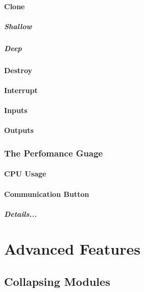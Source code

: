 \subsubsection{Clone}
\paragraph{Shallow}
\paragraph{Deep}
\subsubsection{Destroy}
\subsubsection{Interrupt}
\subsubsection{Inputs}
\subsubsection{Outputs}

\subsection{The Perfomance Guage}
\subsubsection{CPU Usage}
\subsubsection{Communication Button}
\paragraph{Details...}




\chapter{Advanced Features}


\section{Collapsing Modules}


